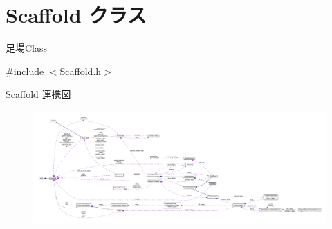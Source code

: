\hypertarget{class_scaffold}{}\section{Scaffold クラス}
\label{class_scaffold}


足場\+Class  




{\ttfamily \#include $<$Scaffold.\+h$>$}



Scaffold 連携図\nopagebreak
\begin{figure}[H]
\begin{center}
\leavevmode
\includegraphics[width=350pt]{class_scaffold__coll__graph}
\end{center}
\end{figure}
